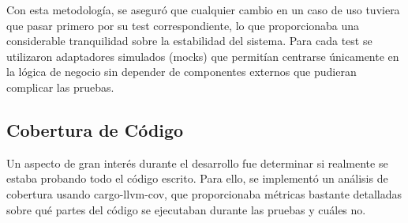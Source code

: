 \begin{table}[ht]
    \centering
    \small
    \caption{Correspondencia entre casos de uso y tests unitarios}
    \label{tab:use_case_tests}
\end{table}

Con esta metodología, se aseguró que cualquier cambio en un caso de uso tuviera que pasar primero por su test correspondiente, lo que proporcionaba una considerable tranquilidad sobre la estabilidad del sistema. Para cada test se utilizaron adaptadores simulados (mocks) que permitían centrarse únicamente en la lógica de negocio sin depender de componentes externos que pudieran complicar las pruebas.

\newpage
\subsection{Cobertura de Código}

Un aspecto de gran interés durante el desarrollo fue determinar si realmente se estaba probando todo el código escrito. Para ello, se implementó un análisis de cobertura usando cargo-llvm-cov, que proporcionaba métricas bastante detalladas sobre qué partes del código se ejecutaban durante las pruebas y cuáles no.

